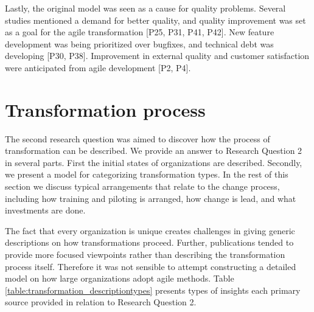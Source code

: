 Lastly, the original model was seen as a cause for quality problems.
Several studies mentioned a demand for better quality, and quality improvement
was set as a goal for the agile transformation [P25, P31, P41, P42]. New feature
development was being prioritized over bugfixes, and technical debt was
developing [P30, P38]. Improvement in external quality and customer satisfaction
were anticipated from agile development [P2, P4].


\clearpage

\section{Transformation process}

The second research question was aimed to discover how the process of
transformation can be described.
We provide an answer to Research Question 2 in several parts. First the initial
states of organizations are described. Secondly, we present a model for
categorizing transformation types. In the rest of this section we discuss
typical arrangements that relate to the change process, including how training
and piloting is arranged, how change is lead, and what investments are done.

The fact that every organization is unique creates challenges in giving generic
descriptions on how transformations proceed. Further, publications tended to
provide more focused viewpoints rather than describing the transformation
process itself. Therefore it was not sensible to attempt constructing a detailed
model on how large organizations adopt agile methods.
Table \ref{table:transformation_descriptiontypes} presents types of insights
each primary source provided in relation to Research Question 2.

